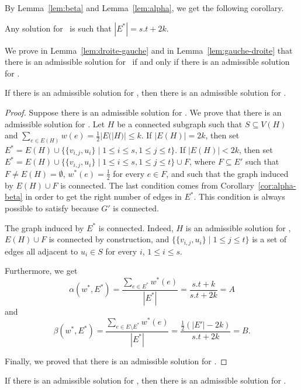 By Lemma~\ref{lem:beta} and Lemma~\ref{lem:alpha}, we get the
following corollary.

\begin{corollary}
\label{cor:alpha-beta}
Any solution for \PROBLEM~is such that $|E^*| = s.t + 2k$.
\end{corollary}

We prove in Lemma~\ref{lem:droite-gauche} and in
Lemma~\ref{lem:gauche-droite} that there is an admissible solution for
\PROBLEM~if and only if there is an admissible solution for \STEINER.

\begin{lemma}
\label{lem:droite-gauche}
If there is an admissible solution for \STEINER, then there is an
admissible solution for \PROBLEM.
\end{lemma}

\begin{proof}
Suppose there is an admissible solution for \STEINER.
We prove that there is an admissible solution for \PROBLEM.
Let $H$ be a connected subgraph such that $S
\subseteq V(H)$ and $\sum_{e \in E(H)}{w(e)} = \frac{1}{2}|E(|H)|
\leq k$.
If $|E(H)| = 2k$, then set $E^* = E(H) \cup \{\{v_{i,j},u_{i}\} \mid 1 \leq i \leq s, 1 \leq j \leq
t\}$.
If $|E(H)| < 2k$, then set $E^* = E(H) \cup \{\{v_{i,j},u_{i}\} \mid 1 \leq i \leq s, 1 \leq j \leq
t\} \cup F$, where $F \subseteq E'$ such that $F \neq E(H) =
\emptyset$, $w^*(e) = \frac{1}{2}$ for every $e \in F$, and such
that the graph induced by $E(H) \cup F$ is connected.
The last condition comes from Corollary~\ref{cor:alpha-beta} in order
to get the right number of edges in $E^*$.
This condition is always possible to satisfy because $G'$ is
connected.

The graph induced by $E^*$ is connected.
Indeed, $H$ is an admissible solution for \STEINER, $E(H) \cup F$ is
connected by construction, and $\{\{v_{i,j},u_{i}\} \mid 1 \leq j \leq
t\}$ is a set of edges all adjacent to $u_{i} \in S$ for every $i$, $1
\leq i \leq s$.

Furthermore, we get
$$\alpha(w^{*},E^*) = \frac{\sum_{e \in E^*}
  w^*(e)}{|E^*|} = \frac{s.t+k}{s.t+2k} = A$$
and
$$\beta(w^{*},E^*) = \frac{\sum_{e \in E \setminus E^*}
  w^*(e)}{|E^*|} = \frac{\frac{1}{2}(|E'|-2k)}{s.t+2k} = B.$$

Finally, we proved that there is an admissible solution for \PROBLEM.
\end{proof}


\begin{lemma}
\label{lem:gauche-droite}
If there is an admissible solution for \PROBLEM, then there is an
admissible solution for \STEINER.
\end{lemma}

